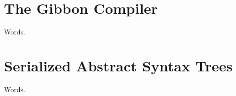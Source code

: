 \documentclass[showabstract,showacknowledgments,showpreface,showdedication]{iuphd}
\begin{document}
\chapter{The Gibbon Compiler}

Words.

\chapter{Serialized Abstract Syntax Trees}

Words.







%


\newpage


\appendix





\end{document}
